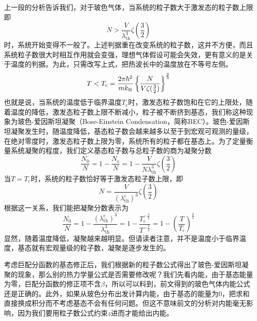 \documentclass[../../main.tex]{subfiles}
\begin{document}
上一段的分析告诉我们，对于玻色气体，当系统的粒子数大于激发态的粒子数上限即
\begin{equation}
    N>\frac{V}{\lambda_{\mathrm{th}}^3}\zeta(\frac{3}{2})
\end{equation}
时，系统开始变得不一般了。上述判据重在改变系统的粒子数，这并不方便，而且系统粒子数很大时相互作用就会变强，理想气体假设可能会失效，更有意义的是关于温度的判据。为此，只需改写上式，把热波长中的温度放在不等号左侧。
\begin{equation}
    T<T_{\mathrm{c}}=\frac{2\pi\hbar^2}{mk_{\mathrm{B}}}\left\{\frac{N}{V\zeta(\frac{3}{2})}\right\}^{\frac{2}{3}}
\end{equation}
也就是说，当系统的温度低于临界温度\(T_{\mathrm{c}}\)时，激发态粒子数饱和在它的上限处，随着温度的降低，激发态粒子数上限不断减小，粒子被不断挤到基态，我们称这种现象为玻色-爱因斯坦凝聚（Bose-Einstein Condensation，简称BEC）。玻色-爱因斯坦凝聚发生时，随温度降低，基态粒子数会越来越多以至于到宏观可观测的量级，在绝对零度时，激发态粒子数上限为零，系统所有的粒子都在基态上。为了定量衡量系统凝聚的程度，我们定义基态粒子数与总粒子数的商为凝聚分数
\begin{equation}
    \frac{N_0}{N}=1-\frac{N_{\mathrm{e}}}{N}=1-\frac{V}{N\lambda_{\mathrm{th}}^3}\zeta(\frac{3}{2})
\end{equation}
当\(T=T_{\mathrm{c}}\)时，系统的粒子数恰好等于激发态粒子数上限，即
\begin{equation}
    N=\frac{V}{(\lambda_{\mathrm{th}}^{\mathrm{c}})^3}\zeta(\frac{3}{2})
\end{equation}
根据这一关系，我们能把凝聚分数表示为
\begin{equation}
    \frac{N_0}{N}=1-\frac{(\lambda_{\mathrm{th}}^{\mathrm{c}})^3}{\lambda_{\mathrm{th}}^3}=1-\frac{T_{\mathrm{c}}^{-\frac{3}{2}}}{T^{-\frac{3}{2}}}=1-\left(\frac{T}{T_c}\right)^{\frac{3}{2}}
\end{equation}
显然，随着温度降低，凝聚越来越明显。但请读者注意，并不是温度小于临界温度，基态就有宏观量级的粒子数，凝聚是逐步发生的。

考虑巨配分函数的基态修正后，我们根据新的粒子数公式得出了玻色-爱因斯坦凝聚的现象，那么别的热力学量公式是否需要修改呢？我们先看内能，由于基态能量为零，巨配分函数的修正项不含\(\beta\)，所以可以料到，前文得到的玻色气体内能公式还是正确的。此外，如果从玻色分布出发计算内能，由于基态的能量为0，把求和直接换成积分而不考虑基态不会有任何问题。但这不意味前文的分析对内能毫无影响，因为我们要用粒子数公式约束\(z\)进而才能给出内能。
\end{document}
